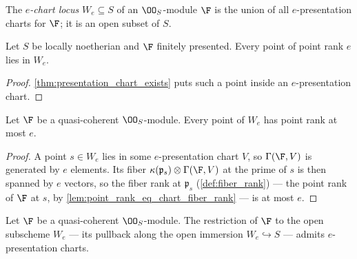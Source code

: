 \begin{definition}
  \label{def:chart_locus}
  \leanok
  The \emph{\(e\)-chart locus} \(W_e \subseteq S\) of an \(\OO_S\)-module
  \(\F\) is the union of all \(e\)-presentation charts for \(\F\); it is an
  open subset of \(S\).
\end{definition}

\begin{lemma}
  \label{lem:chart_locus_contains_rank_locus}
  \leanok
  Let \(S\) be locally noetherian and \(\F\) finitely presented.  Every
  point of point rank \(e\) lies in \(W_e\).
\end{lemma}

\begin{proof}
  \leanok
  \cref{thm:presentation_chart_exists} puts such a point inside an
  \(e\)-presentation chart.
\end{proof}

\begin{lemma}
  \label{lem:chart_locus_rank_bound}
  \leanok
  Let \(\F\) be a quasi-coherent \(\OO_S\)-module.  Every point of \(W_e\)
  has point rank at most \(e\).
\end{lemma}

\begin{proof}
  \leanok
  A point \(s \in W_e\) lies in some \(e\)-presentation chart \(V\), so
  \(\Gamma(\F, V)\) is generated by \(e\) elements.  Its fiber
  \(\kappa(\mathfrak p_s) \otimes \Gamma(\F, V)\) at the prime of \(s\) is
  then spanned by \(e\) vectors, so the fiber rank at \(\mathfrak p_s\)
  (\cref{def:fiber_rank}) --- the point rank of \(\F\) at \(s\), by
  \cref{lem:point_rank_eq_chart_fiber_rank} --- is at most \(e\).
\end{proof}

\begin{lemma}
  \label{lem:charts_cover_chart_locus}
  \leanok
  Let \(\F\) be a quasi-coherent \(\OO_S\)-module.  The restriction of
  \(\F\) to the open subscheme \(W_e\) --- its pullback along the open
  immersion \(W_e \hookrightarrow S\) --- admits \(e\)-presentation charts.
\end{lemma}

